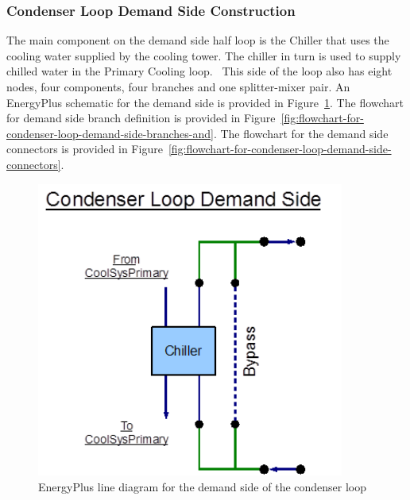 \subsubsection{Condenser Loop Demand Side Construction}\label{condenser-loop-demand-side-construction}

The main component on the demand side half loop is the Chiller that uses the cooling water supplied by the cooling tower. The chiller in turn is used to supply chilled water in the Primary Cooling loop. ~This side of the loop also has eight nodes, four components, four branches and one splitter-mixer pair. An EnergyPlus schematic for the demand side is provided in Figure~\ref{fig:energyplus-line-diagram-for-the-demand-side-001}. The flowchart for demand side branch definition is provided in Figure~\ref{fig:flowchart-for-condenser-loop-demand-side-branches-and}. The flowchart for the demand side connectors is provided in Figure~\ref{fig:flowchart-for-condenser-loop-demand-side-connectors}.

\begin{figure}[hbtp] %
\centering
\includegraphics[width=0.9\textwidth, height=0.9\textheight, keepaspectratio=true]{media/image067.png}
\caption{EnergyPlus line diagram for the demand side of the condenser loop \protect \label{fig:energyplus-line-diagram-for-the-demand-side-001}}
\end{figure}

